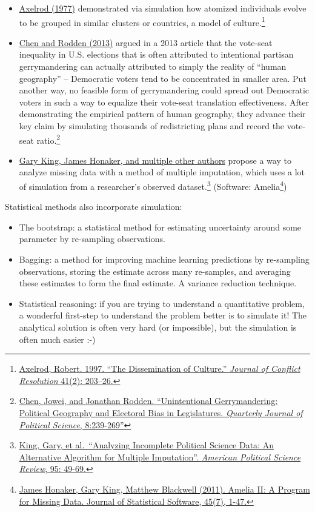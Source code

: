 \documentclass[
]{book}
\providecommand{\tightlist}{%
  \setlength{\itemsep}{0pt}\setlength{\parskip}{0pt}}
\theoremstyle{definition}
\theoremstyle{definition}
\theoremstyle{definition}
\theoremstyle{remark}
\begin{document}
\begin{itemize}
\tightlist
\item
  \href{http://www-personal.umich.edu/~axe/research/Dissemination.pdf}{Axelrod (1977)} demonstrated via simulation how atomized individuals evolve to be grouped in similar clusters or countries, a model of culture.\footnote{\href{http://www-personal.umich.edu/~axe/research/Dissemination.pdf}{Axelrod, Robert. 1997. ``The Dissemination of Culture.'' \emph{Journal of Conflict Resolution} 41(2): 203--26.}}
\item
  \href{http://www-personal.umich.edu/~jowei/florida.pdf}{Chen and Rodden (2013)} argued in a 2013 article that the vote-seat inequality in U.S. elections that is often attributed to intentional partisan gerrymandering can actually attributed to simply the reality of ``human geography'' -- Democratic voters tend to be concentrated in smaller area. Put another way, no feasible form of gerrymandering could spread out Democratic voters in such a way to equalize their vote-seat translation effectiveness. After demonstrating the empirical pattern of human geography, they advance their key claim by simulating thousands of redistricting plans and record the vote-seat ratio.\footnote{\href{http://www-personal.umich.edu/~jowei/florida.pdf}{Chen, Jowei, and Jonathan Rodden. ``Unintentional Gerrymandering: Political Geography and Electoral Bias in Legislatures. \emph{Quarterly Journal of Political Science}, 8:239-269''}}
\item
  \href{https://gking.harvard.edu/files/abs/evil-abs.shtml}{Gary King, James Honaker, and multiple other authors} propose a way to analyze missing data with a method of multiple imputation, which uses a lot of simulation from a researcher's observed dataset.\footnote{\href{https://gking.harvard.edu/files/abs/evil-abs.shtml}{King, Gary, et al.~``Analyzing Incomplete Political Science Data: An Alternative Algorithm for Multiple Imputation''. \emph{American Political Science Review}, 95: 49-69.}} (Software: Amelia\footnote{\href{http://www.jstatsoft.org/v45/i07/}{James Honaker, Gary King, Matthew Blackwell (2011). Amelia II: A Program for Missing Data. Journal of
    Statistical Software, 45(7), 1-47.}})
\end{itemize}

Statistical methods also incorporate simulation:

\begin{itemize}
\tightlist
\item
  The bootstrap: a statistical method for estimating uncertainty around some parameter by re-sampling observations.
\item
  Bagging: a method for improving machine learning predictions by re-sampling observations, storing the estimate across many re-samples, and averaging these estimates to form the final estimate. A variance reduction technique.
\item
  Statistical reasoning: if you are trying to understand a quantitative problem, a wonderful first-step to understand the problem better is to simulate it! The analytical solution is often very hard (or impossible), but the simulation is often much easier :-)
\end{itemize}
\end{document}
